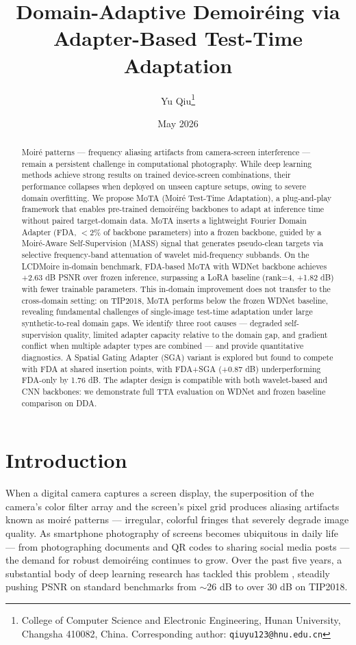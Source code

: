 \documentclass[10pt,twocolumn,letterpaper]{article}
\title{Domain-Adaptive Demoir\'{e}ing via Adapter-Based Test-Time Adaptation}
\author{Yu Qiu\thanks{College of Computer Science and Electronic Engineering, Hunan University, Changsha 410082, China. Corresponding author: {\tt qiuyu123@hnu.edu.cn}}}
\date{May 2026}
\begin{document}
\maketitle

\begin{abstract}
Moir\'{e} patterns --- frequency aliasing artifacts from camera-screen interference --- remain a persistent challenge in computational photography. While deep learning methods achieve strong results on trained device-screen combinations, their performance collapses when deployed on unseen capture setups, owing to severe domain overfitting. We propose MoTA (Moir\'{e} Test-Time Adaptation), a plug-and-play framework that enables pre-trained demoir\'{e}ing backbones to adapt at inference time without paired target-domain data. MoTA inserts a lightweight Fourier Domain Adapter (FDA, $<$2\% of backbone parameters) into a frozen backbone, guided by a Moir\'{e}-Aware Self-Supervision (MASS) signal that generates pseudo-clean targets via selective frequency-band attenuation of wavelet mid-frequency subbands. On the LCDMoire in-domain benchmark, FDA-based MoTA with WDNet backbone achieves +2.63 dB PSNR over frozen inference, surpassing a LoRA baseline (rank=4, +1.82 dB) with fewer trainable parameters. This in-domain improvement does not transfer to the cross-domain setting: on TIP2018, MoTA performs below the frozen WDNet baseline, revealing fundamental challenges of single-image test-time adaptation under large synthetic-to-real domain gaps. We identify three root causes --- degraded self-supervision quality, limited adapter capacity relative to the domain gap, and gradient conflict when multiple adapter types are combined --- and provide quantitative diagnostics. A Spatial Gating Adapter (SGA) variant is explored but found to compete with FDA at shared insertion points, with FDA+SGA (+0.87 dB) underperforming FDA-only by 1.76 dB. The adapter design is compatible with both wavelet-based and CNN backbones: we demonstrate full TTA evaluation on WDNet and frozen baseline comparison on DDA.
\end{abstract}

\section{Introduction}

When a digital camera captures a screen display, the superposition of the camera's color filter array and the screen's pixel grid produces aliasing artifacts known as moir\'{e} patterns --- irregular, colorful fringes that severely degrade image quality. As smartphone photography of screens becomes ubiquitous in daily life --- from photographing documents and QR codes to sharing social media posts --- the demand for robust demoir\'{e}ing continues to grow. Over the past five years, a substantial body of deep learning research has tackled this problem \cite{sun2018moire,zheng2022learning,he2020fhde2net,yu2022towards,anonymous2025moirenet}, steadily pushing PSNR on standard benchmarks from $\sim$26 dB to over 30 dB on TIP2018.
\end{document}
